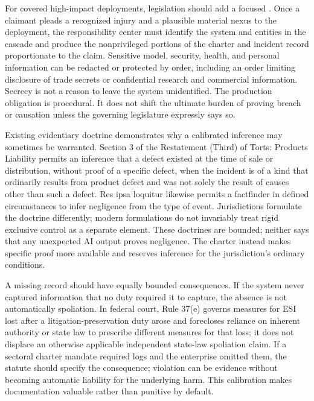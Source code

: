 For covered high-impact deployments, legislation should add a focused . Once a claimant pleads a recognized injury and a plausible material nexus to the deployment, the responsibility center must identify the system and entities in the cascade and produce the nonprivileged portions of the charter and incident record proportionate to the claim. Sensitive model, security, health, and personal information can be redacted or protected by order, including an order limiting disclosure of trade secrets or confidential research and commercial information. Secrecy is not a reason to leave the system unidentified. The production obligation is procedural. It does not shift the ultimate burden of proving breach or causation unless the governing legislature expressly says so.

Existing evidentiary doctrine demonstrates why a calibrated inference may sometimes be warranted. Section 3 of the Restatement (Third) of Torts: Products Liability permits an inference that a defect existed at the time of sale or distribution, without proof of a specific defect, when the incident is of a kind that ordinarily results from product defect and was not solely the result of causes other than such a defect. Res ipsa loquitur likewise permits a factfinder in defined circumstances to infer negligence from the type of event. Jurisdictions formulate the doctrine differently; modern formulations do not invariably treat rigid exclusive control as a separate element. These doctrines are bounded; neither says that any unexpected AI output proves negligence. The charter instead makes specific proof more available and reserves inference for the jurisdiction's ordinary conditions.

A missing record should have equally bounded consequences. If the system never captured information that no duty required it to capture, the absence is not automatically spoliation. In federal court, Rule 37(e) governs measures for ESI lost after a litigation-preservation duty arose and forecloses reliance on inherent authority or state law to prescribe different measures for that loss; it does not displace an otherwise applicable independent state-law spoliation claim. If a sectoral charter mandate required logs and the enterprise omitted them, the statute should specify the consequence; violation can be evidence without becoming automatic liability for the underlying harm. This calibration makes documentation valuable rather than punitive by default.

